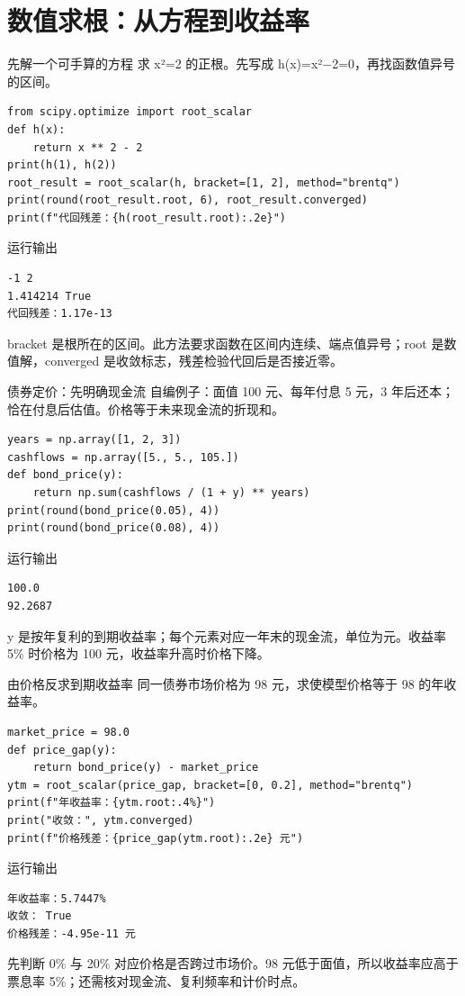 \documentclass[9pt]{ctexbeamer}
\begin{document}
\section{数值求根：从方程到收益率}

\begin{frame}[fragile]{先解一个可手算的方程}
\small 求 x²=2 的正根。先写成 h(x)=x²−2=0，再找函数值异号的区间。
\medskip
\begin{lstlisting}
from scipy.optimize import root_scalar
def h(x):
    return x ** 2 - 2
print(h(1), h(2))
root_result = root_scalar(h, bracket=[1, 2], method="brentq")
print(round(root_result.root, 6), root_result.converged)
print(f"代回残差：{h(root_result.root):.2e}")
\end{lstlisting}
\begin{exampleblock}{运行输出}
\begin{lstlisting}
-1 2
1.414214 True
代回残差：1.17e-13
\end{lstlisting}
\end{exampleblock}
\small bracket 是根所在的区间。此方法要求函数在区间内连续、端点值异号；root 是数值解，converged 是收敛标志，残差检验代回后是否接近零。
\end{frame}

\begin{frame}[fragile]{债券定价：先明确现金流}
\small 自编例子：面值 100 元、每年付息 5 元，3 年后还本；恰在付息后估值。价格等于未来现金流的折现和。
\medskip
\begin{lstlisting}
years = np.array([1, 2, 3])
cashflows = np.array([5., 5., 105.])
def bond_price(y):
    return np.sum(cashflows / (1 + y) ** years)
print(round(bond_price(0.05), 4))
print(round(bond_price(0.08), 4))
\end{lstlisting}
\begin{exampleblock}{运行输出}
\begin{lstlisting}
100.0
92.2687
\end{lstlisting}
\end{exampleblock}
\small y 是按年复利的到期收益率；每个元素对应一年末的现金流，单位为元。收益率 5\% 时价格为 100 元，收益率升高时价格下降。
\end{frame}

\begin{frame}[fragile]{由价格反求到期收益率}
\small 同一债券市场价格为 98 元，求使模型价格等于 98 的年收益率。
\medskip
\begin{lstlisting}
market_price = 98.0
def price_gap(y):
    return bond_price(y) - market_price
ytm = root_scalar(price_gap, bracket=[0, 0.2], method="brentq")
print(f"年收益率：{ytm.root:.4%}")
print("收敛：", ytm.converged)
print(f"价格残差：{price_gap(ytm.root):.2e} 元")
\end{lstlisting}
\begin{exampleblock}{运行输出}
\begin{lstlisting}
年收益率：5.7447%
收敛： True
价格残差：-4.95e-11 元
\end{lstlisting}
\end{exampleblock}
\small 先判断 0\% 与 20\% 对应价格是否跨过市场价。98 元低于面值，所以收益率应高于票息率 5\%；还需核对现金流、复利频率和计价时点。
\end{frame}
\end{document}
